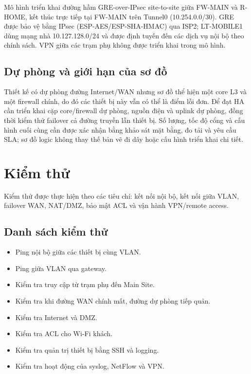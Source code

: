 Mô hình triển khai đường hầm GRE-over-IPsec site-to-site giữa FW-MAIN và R-HOME, kết thúc trực tiếp tại FW-MAIN trên Tunnel0 (10.254.0.0/30). GRE được bảo vệ bằng IPsec (ESP-AES/ESP-SHA-HMAC) qua ISP2; LT-MOBILE1 dùng mạng nhà 10.127.128.0/24 và được định tuyến đến các dịch vụ nội bộ theo chính sách. VPN giữa các trạm phụ không được triển khai trong mô hình.

\subsection{Dự phòng và giới hạn của sơ đồ}

Thiết kế có dự phòng đường Internet/WAN nhưng sơ đồ thể hiện một core L3 và một firewall chính, do đó các thiết bị này vẫn có thể là điểm lỗi đơn. Để đạt HA cần triển khai cặp core/firewall dự phòng, nguồn điện và uplink dự phòng, đồng thời kiểm thử failover cả đường truyền lẫn thiết bị. Số lượng, tốc độ cổng và cấu hình cuối cùng cần được xác nhận bằng khảo sát mặt bằng, đo tải và yêu cầu SLA; sơ đồ logic không thay thế bản vẽ đi dây hoặc cấu hình triển khai chi tiết.

\section{Kiểm thử}

Kiểm thử được thực hiện theo các tiêu chí: kết nối nội bộ, kết nối giữa VLAN, failover WAN, NAT/DMZ, bảo mật ACL và vận hành VPN/remote access.

\subsection{Danh sách kiểm thử}

\begin{itemize}
    \item Ping nội bộ giữa các thiết bị cùng VLAN.
    \item Ping giữa VLAN qua gateway.
    \item Kiểm tra truy cập từ trạm phụ đến Main Site.
    \item Kiểm tra khi đường WAN chính mất, đường dự phòng tiếp quản.
    \item Kiểm tra Internet và DMZ.
    \item Kiểm tra ACL cho Wi-Fi khách.
    \item Kiểm tra quản trị thiết bị bằng SSH và logging.
    \item Kiểm tra hoạt động của syslog, NetFlow và VPN.
\end{itemize}

